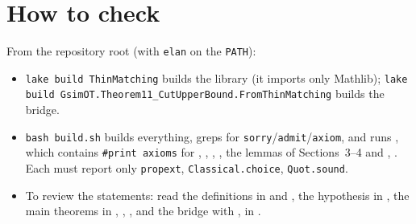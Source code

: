 \section{How to check}
From the repository root (with \texttt{elan} on the \texttt{PATH}):
\begin{itemize}
\item \texttt{lake build ThinMatching} builds the library (it imports only Mathlib);
  \texttt{lake build GsimOT.Theorem11\_CutUpperBound.FromThinMatching} builds the bridge.
\item \texttt{bash build.sh} builds everything, greps for \texttt{sorry}/\texttt{admit}/\texttt{axiom}, and runs
  , which contains
  \texttt{\#print axioms} for , ,
  , , the lemmas of Sections~3--4 and
  , . Each must report
  only \texttt{propext}, \texttt{Classical.choice}, \texttt{Quot.sound}.
\item To review the statements: read the definitions in  and , the
  hypothesis  in , the main theorems in
  , , , and the bridge with
  ,  in .
\end{itemize}

